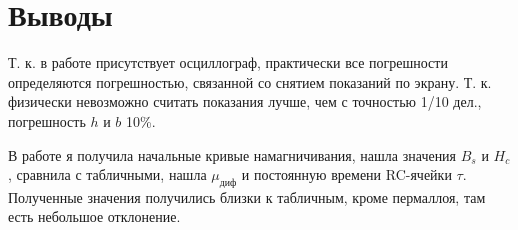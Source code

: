\documentclass[11pt]{article}
\begin{document}
\begin{enumerate}
\end{enumerate}




\section{Выводы}

Т. к. в работе присутствует осциллограф, практически все погрешности определяются погрешностью, связанной со снятием показаний по экрану. Т. к. физически невозможно считать показания лучше, чем с точностью 1/10 дел., погрешность $ h $ и $ b $ 10\%. 

В работе я получила начальные кривые намагничивания, нашла значения $B_s$ и $H_c$, сравнила с табличными, нашла $\mu_{диф}$ и постоянную времени RC-ячейки $\tau$. Полученные значения получились близки к табличным, кроме пермаллоя, там есть небольшое отклонение.
\end{document}
